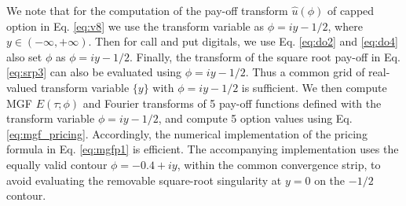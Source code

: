 \documentclass[pdftex,11pt,a4paper] {article}
\begin{document}
We note that for the computation of the pay-off transform $\widehat{u}%
(\phi)$ of capped option in Eq. \eqref{eq:v8} we use the transform variable as $\phi=iy-1/2$, where $y\in(-\infty, + \infty)$. Then for
call and put digitals, we use Eq. \eqref{eq:do2} and \eqref{eq:do4} also set $\phi$ as $%
\phi=iy-1/2$. Finally, the transform of the square root pay-off in Eq. %
\eqref{eq:srp3} can also be evaluated using $\phi=iy-1/2$. Thus a common grid of real-valued transform variable $\{y\}$ with $\phi=iy-1/2$ is sufficient.
We then compute MGF $E(\tau; \phi)$ and Fourier transforms of 5 pay-off functions defined with the transform variable $%
\phi=iy-1/2$, and compute 5 option values using Eq. \eqref{eq:mgf_pricing}.
Accordingly, the numerical implementation of the pricing formula in Eq. %
\eqref{eq:mgfp1} is efficient. The accompanying implementation uses the equally valid contour $\phi=-0.4+iy$, within the common convergence strip, to avoid evaluating the removable square-root singularity at $y=0$ on the $-1/2$ contour.
\end{document}
